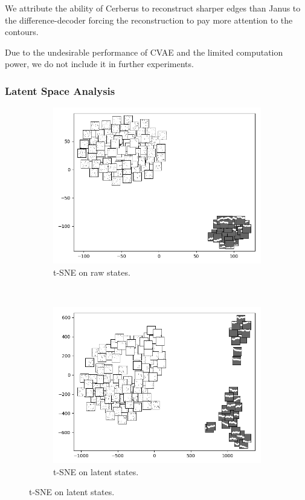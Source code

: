 We attribute the ability of Cerberus to reconstruct sharper edges than Janus to the difference-decoder forcing the reconstruction to pay more attention to the contours.

Due to the undesirable performance of CVAE and the limited computation power, we do not include it in further experiments.

\subsubsection{Latent Space Analysis}
\begin{figure}[t!]
	\centering
	\begin{subfigure}{0.46\columnwidth}
		\centering
		\includegraphics[width=\linewidth]{documentation/report/img/scroller_state.png}
		\caption{t-SNE on raw states.}
		\label{subfig:tsne_multitask_states}
	\end{subfigure}%
	~ 
	\begin{subfigure}{0.46\columnwidth}
		\centering
		\includegraphics[width=\linewidth]{documentation/report/img/scroller_latent.png}
		\caption{t-SNE on latent states.}
		\label{subfig:tsne_multitask_latent}
	\end{subfigure}


\end{figure}
